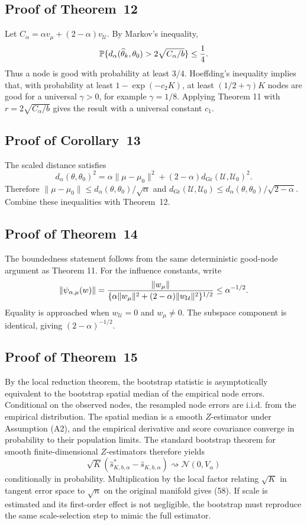 \documentclass[11pt]{article}
\newcommand{\Pbb}{\mathbb P}
\newcommand{\dto}{\rightsquigarrow}
\newcommand{\Normal}{\mathcal N}
\newcommand{\U}{\mathcal U}
\newcommand{\Gr}{\operatorname{Gr}}
\begin{document}
\subsection{Proof of Theorem~12}
Let \(C_\alpha=\alpha v_\mu+(2-\alpha)v_\U\).  By Markov's inequality,
\[
    \Pbb\{d_\alpha(\widehat\theta_k,\theta_0)>2\sqrt{C_\alpha/b}\}\le {1\over4}.
\]
Thus a node is good with probability at least \(3/4\).  Hoeffding's inequality implies that, with probability at least \(1-\exp(-c_2K)\), at least \((1/2+\gamma)K\) nodes are good for a universal \(\gamma>0\), for example \(\gamma=1/8\).  Applying Theorem 11 with \(r=2\sqrt{C_\alpha/b}\) gives the result with a universal constant \(c_1\).

\subsection{Proof of Corollary~13}
The scaled distance satisfies
\[
    d_\alpha(\theta,\theta_0)^2
    =\alpha\|\mu-\mu_0\|^2+(2-\alpha)d_{\Gr}(\U,\U_0)^2.
\]
Therefore \(\|\mu-\mu_0\|\le d_\alpha(\theta,\theta_0)/\sqrt\alpha\) and \(d_{\Gr}(\U,\U_0)\le d_\alpha(\theta,\theta_0)/\sqrt{2-\alpha}\).  Combine these inequalities with Theorem~12.

\subsection{Proof of Theorem~14}
The boundedness statement follows from the same deterministic good-node argument as Theorem 11.  For the influence constants, write
\[
    \|\psi_{\alpha,\mu}(w)\|
    ={\|w_\mu\|\over\{\alpha\|w_\mu\|^2+(2-\alpha)\|w_\U\|^2\}^{1/2}}
    \le \alpha^{-1/2}.
\]
Equality is approached when \(w_\U=0\) and \(w_\mu\ne0\).  The subspace component is identical, giving \((2-\alpha)^{-1/2}\).

\subsection{Proof of Theorem~15}
By the local reduction theorem, the bootstrap statistic is asymptotically equivalent to the bootstrap spatial median of the empirical node errors.  Conditional on the observed nodes, the resampled node errors are i.i.d. from the empirical distribution.  The spatial median is a smooth \(Z\)-estimator under Assumption (A2), and the empirical derivative and score covariance converge in probability to their population limits.  The standard bootstrap theorem for smooth finite-dimensional \(Z\)-estimators therefore yields
\[
    \sqrt K(\widehat s_{K,b,\alpha}^*-\widehat s_{K,b,\alpha})\dto \Normal(0,V_\alpha)
\]
conditionally in probability.  Multiplication by the local factor relating \(\sqrt K\) in tangent error space to \(\sqrt n\) on the original manifold gives (58).  If scale is estimated and its first-order effect is not negligible, the bootstrap must reproduce the same scale-selection step to mimic the full estimator.
\end{document}
